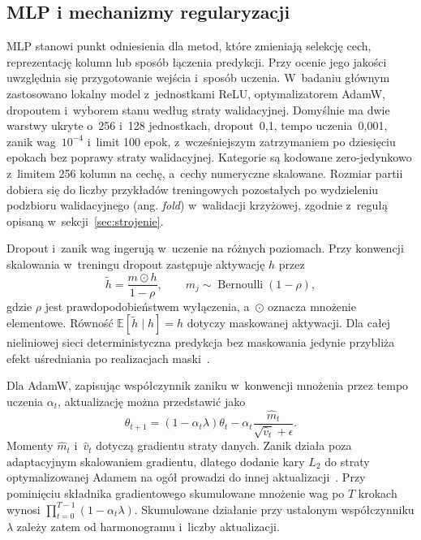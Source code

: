 \subsection{MLP i mechanizmy regularyzacji}
\label{sec:mlp}

MLP stanowi punkt odniesienia dla metod, które zmieniają selekcję cech, reprezentację kolumn lub sposób łączenia predykcji. Przy ocenie jego jakości uwzględnia się przygotowanie wejścia i~sposób uczenia. W~badaniu głównym zastosowano lokalny model z~jednostkami ReLU, optymalizatorem AdamW, dropoutem i~wyborem stanu według straty walidacyjnej. Domyślnie ma dwie warstwy ukryte o~256 i~128 jednostkach, dropout~0,1, tempo uczenia~0,001, zanik wag~$10^{-4}$ i~limit 100 epok, z~wcześniejszym zatrzymaniem po dziesięciu epokach bez poprawy straty walidacyjnej. Kategorie są kodowane zero-jedynkowo z~limitem 256 kolumn na cechę, a~cechy numeryczne skalowane. Rozmiar partii dobiera się do liczby przykładów treningowych pozostałych po wydzieleniu podzbioru walidacyjnego (ang. \textit{fold}) w~walidacji krzyżowej, zgodnie z~regułą opisaną w~sekcji~\ref{sec:strojenie}.

Dropout i~zanik wag ingerują w~uczenie na różnych poziomach. Przy konwencji skalowania w~treningu dropout zastępuje aktywację $h$ przez
\begin{equation}
\widetilde h=\frac{m\odot h}{1-\rho},\qquad
m_j\sim\operatorname{Bernoulli}(1-\rho),
\label{eq:dropout}
\end{equation}
gdzie $\rho$ jest prawdopodobieństwem wyłączenia, a~$\odot$ oznacza mnożenie elementowe. Równość $\mathbb{E}[\widetilde h\mid h]=h$ dotyczy maskowanej aktywacji. Dla całej nieliniowej sieci deterministyczna predykcja bez maskowania jedynie przybliża efekt uśredniania po realizacjach maski~\cite{srivastava2014dropout}.

Dla AdamW, zapisując współczynnik zaniku w~konwencji mnożenia przez tempo uczenia $\alpha_t$, aktualizację można przedstawić jako
\begin{equation}
\theta_{t+1}=(1-\alpha_t\lambda)\theta_t
-\alpha_t\frac{\widehat m_t}{\sqrt{\widehat v_t}+\epsilon}.
\label{eq:adamw}
\end{equation}
Momenty $\widehat m_t$ i~$\widehat v_t$ dotyczą gradientu straty danych. Zanik działa poza adaptacyjnym skalowaniem gradientu, dlatego dodanie kary $L_2$ do straty optymalizowanej Adamem na ogół prowadzi do innej aktualizacji~\cite{loshchilov2019adamw}. Przy pominięciu składnika gradientowego skumulowane mnożenie wag po $T$ krokach wynosi $\prod_{t=0}^{T-1}(1-\alpha_t\lambda)$. Skumulowane działanie przy ustalonym współczynniku $\lambda$ zależy zatem od harmonogramu i~liczby aktualizacji.

